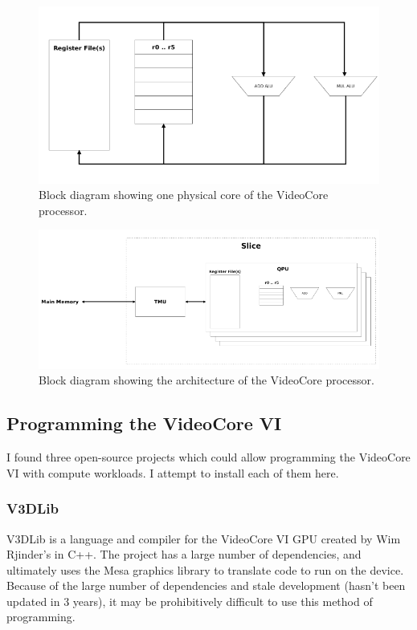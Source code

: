 \documentclass[12pt]{article}
\begin{document}
\begin{figure}[h]
\centering
\includegraphics[width=1.0\textwidth]{v3d_alus.png} %
\caption{Block diagram showing one physical core of the VideoCore processor.}
\label{fig:v3d_core}
\end{figure}

\begin{figure}[h]
\centering
\includegraphics[width=1.0\textwidth]{v3d_core.png} %
\caption{Block diagram showing the architecture of the VideoCore processor.}
\label{fig:v3d_alus}
\end{figure}

\subsection{Programming the VideoCore VI}

I found three open-source projects which could allow programming the VideoCore VI with compute workloads. I attempt to install each of them here.

\subsubsection{V3DLib}

V3DLib is a language and compiler for the VideoCore VI GPU created by Wim Rjinder's in C++. The project has a large number of dependencies, and ultimately uses the Mesa graphics library to translate code to run on the device. Because of the large number of dependencies and stale development (hasn't been updated in 3 years), it may be prohibitively difficult to use this method of programming. 
\end{document}
